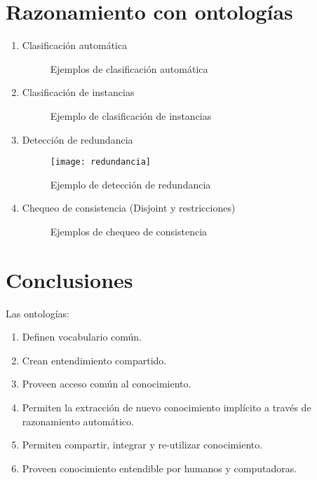 \documentclass[12pt]{article}
\begin{document}
\section{Razonamiento con ontologías}
\begin{enumerate}
\item Clasificación automática
\begin{figure}[H]
 \centering
 \caption{Ejemplos de clasificación automática}
 \label{f:automatica}
\end{figure}
\item Clasificación de instancias
\begin{figure}[H]
 \centering
 \caption{Ejemplo de clasificación de instancias}
 \label{f:instancia}
\end{figure}
\item Detección de redundancia
\begin{figure}[H]
\centering
\texttt{[image: redundancia]}
\caption{Ejemplo de detección de redundancia}
\label{fig:redundancia}
\end{figure}
\item Chequeo de consistencia (Disjoint y restricciones)
\begin{figure}[H]
 \centering
 \caption{Ejemplos de chequeo de consistencia}
 \label{f:instancia}
\end{figure}
\end{enumerate}

\section{Conclusiones}
Las ontologías:
\begin{enumerate}
\item Definen vocabulario común.
\item Crean entendimiento compartido.
\item Proveen acceso común al conocimiento.
\item Permiten la extracción de nuevo conocimiento implícito a través de razonamiento automático.
\item Permiten compartir, integrar y re-utilizar conocimiento.
\item Proveen conocimiento entendible por humanos y computadoras.
\end{enumerate}
\end{document}
